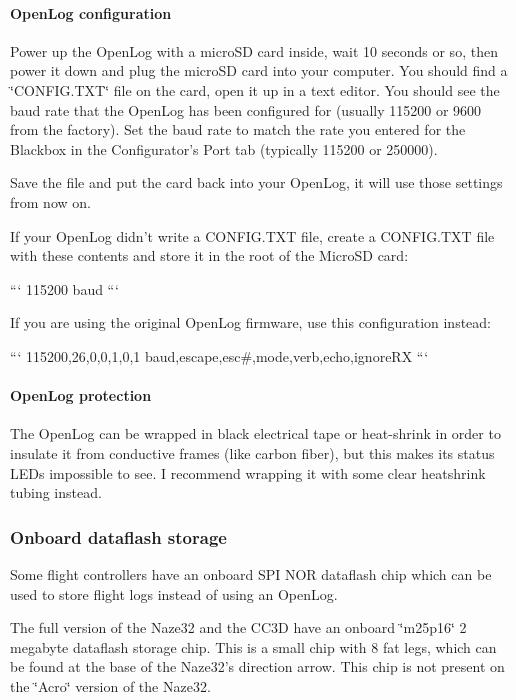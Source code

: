 \paragraph*{Open\+Log configuration}

Power up the Open\+Log with a micro\+S\+D card inside, wait 10 seconds or so, then power it down and plug the micro\+S\+D card into your computer. You should find a \char`\"{}\+C\+O\+N\+F\+I\+G.\+T\+X\+T\char`\"{} file on the card, open it up in a text editor. You should see the baud rate that the Open\+Log has been configured for (usually 115200 or 9600 from the factory). Set the baud rate to match the rate you entered for the Blackbox in the Configurator's Port tab (typically 115200 or 250000).

Save the file and put the card back into your Open\+Log, it will use those settings from now on.

If your Open\+Log didn't write a C\+O\+N\+F\+I\+G.\+T\+X\+T file, create a C\+O\+N\+F\+I\+G.\+T\+X\+T file with these contents and store it in the root of the Micro\+S\+D card\+:

``` 115200 baud ```

If you are using the original Open\+Log firmware, use this configuration instead\+:

``` 115200,26,0,0,1,0,1 baud,escape,esc\#,mode,verb,echo,ignore\+R\+X ```

\paragraph*{Open\+Log protection}

The Open\+Log can be wrapped in black electrical tape or heat-\/shrink in order to insulate it from conductive frames (like carbon fiber), but this makes its status L\+E\+Ds impossible to see. I recommend wrapping it with some clear heatshrink tubing instead.



\subsubsection*{Onboard dataflash storage}

Some flight controllers have an onboard S\+P\+I N\+O\+R dataflash chip which can be used to store flight logs instead of using an Open\+Log.

The full version of the Naze32 and the C\+C3\+D have an onboard \char`\"{}m25p16\char`\"{} 2 megabyte dataflash storage chip. This is a small chip with 8 fat legs, which can be found at the base of the Naze32's direction arrow. This chip is not present on the \char`\"{}\+Acro\char`\"{} version of the Naze32.

